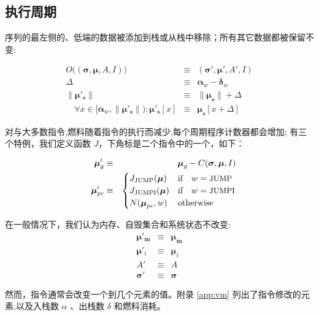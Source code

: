 \documentclass[9pt,oneside]{amsart}
\begin{document}
\begin{multicols}{2}
\subsection{执行周期}
序列的最左侧的、低端的数据被添加到栈或从栈中移除；所有其它数据都被保留不变:

\begin{eqnarray}
O\big((\boldsymbol{\sigma}, \boldsymbol{\mu}, A, I)\big) & \equiv & (\boldsymbol{\sigma}', \boldsymbol{\mu}', A', I) \\
\Delta & \equiv & \mathbf{\alpha}_w - \mathbf{\delta}_w \\
\lVert\boldsymbol{\mu}'_\mathbf{s}\rVert & \equiv & \lVert\boldsymbol{\mu}_\mathbf{s}\rVert + \Delta \\
\quad \forall x \in [\mathbf{\alpha}_w, \lVert\boldsymbol{\mu}'_\mathbf{s}\rVert): \boldsymbol{\mu}'_\mathbf{s}[x] & \equiv & \boldsymbol{\mu}_\mathbf{s}[x+\Delta]
\end{eqnarray}

对与大多数指令,燃料随着指令的执行而减少,每个周期程序计数器都会增加; 有三个特例，我们定义函数  $J$，下角标是二个指令中的一个，如下：

\begin{eqnarray}
\quad \boldsymbol{\mu}'_{g} & \equiv & \boldsymbol{\mu}_{g} - C(\boldsymbol{\sigma}, \boldsymbol{\mu}, I) \\
\quad \boldsymbol{\mu}'_{pc} & \equiv & \begin{cases}
J_{\text{JUMP}}(\boldsymbol{\mu}) & \text{if} \quad w = \text{\small JUMP} \\
J_{\text{JUMPI}}(\boldsymbol{\mu}) & \text{if} \quad w = \text{\small JUMPI} \\
N(\boldsymbol{\mu}_{pc}, w) & \text{otherwise}
\end{cases}
\end{eqnarray}

在一般情况下，我们认为内存、自毁集合和系统状态不改变:
\begin{eqnarray}
\boldsymbol{\mu}'_\mathbf{m} & \equiv & \boldsymbol{\mu}_\mathbf{m} \\
\boldsymbol{\mu}'_i & \equiv & \boldsymbol{\mu}_i \\
A' & \equiv & A \\
\boldsymbol{\sigma}' & \equiv & \boldsymbol{\sigma}
\end{eqnarray}


然而，指令通常会改变一个到几个元素的值。附录 \ref{app:vm} 列出了指令修改的元素,以及入栈数 $\alpha$ 、出栈数 $\delta$ 和燃料消耗。


\end{multicols}
\end{document}

